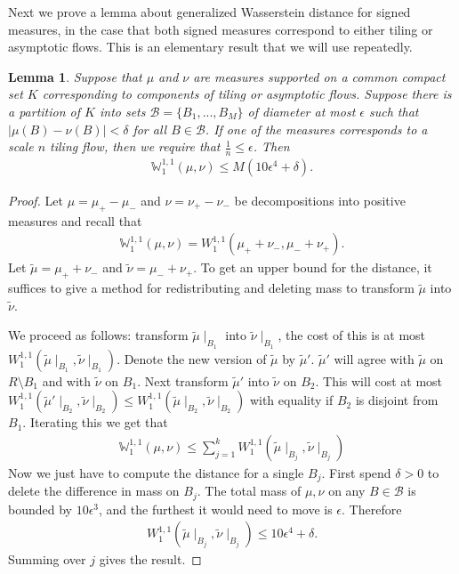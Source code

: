 \documentclass[11pt]{article}
\newtheorem{lemma}[thm]{Lemma}
\theoremstyle{remark}
\theoremstyle{definition}
\newcommand{\mc}[1]{\mathcal{#1}}
\newcommand{\m}[1]{\mathbb{#1}}
\begin{document}
Next we prove a lemma about generalized Wasserstein distance for signed measures, in the case that both signed measures correspond to either tiling or asymptotic flows. This is an elementary result that we will use repeatedly.
\begin{lemma}\label{lem:covered}
	Suppose that $\mu$ and $\nu$ are measures supported on a common compact set $K$ corresponding to components of tiling or asymptotic flows. Suppose there is a partition of $K$ into sets $\mathcal{B} = \{B_1,...,B_M\}$ of diameter at most $\epsilon$ such that $\bigg|\mu(B)-\nu(B) \bigg| < \delta$ for all $B\in \mathcal{B}$. If one of the measures corresponds to a scale $n$ tiling flow, then we require that $\frac{1}{n}\leq \epsilon$. Then 
	\begin{align*}
		\m W^{1,1}_1(\mu,\nu) \leq M(10\epsilon^4 +\delta).
	\end{align*}
\end{lemma}
\begin{proof}
Let $\mu = \mu_+ - \mu_-$ and $\nu = \nu_+ - \nu_-$ be decompositions into positive measures and recall that
\begin{align*}
    \m W_1^{1,1}(\mu,\nu) = W_1^{1,1}(\mu_+ + \nu_-, \mu_- + \nu_+).
\end{align*}
Let $\tilde{\mu} = \mu_+ + \nu_-$ and $\tilde{\nu} = \mu_- + \nu_+$. To get an upper bound for the distance, it suffices to give a method for redistributing and deleting mass to transform $\tilde{\mu}$ into $\tilde{\nu}$.  

We proceed as follows: transform $\tilde{\mu}\mid_{B_1}$ into $\tilde{\nu}\mid_{B_1}$, the cost of this is at most $W^{1,1}_1(\tilde{\mu}\mid_{B_1}, \tilde{\nu}\mid_{B_1})$. Denote the new version of $\tilde{\mu}$ by $\tilde{\mu}'$. $\tilde{\mu}'$ will agree with $\tilde{\mu}$ on $R\setminus B_1$ and with $\tilde{\nu}$ on $B_1$. Next transform $\tilde{\mu}'$ into $\tilde{\nu}$ on $B_2$. This will cost at most $W^{1,1}_1(\tilde{\mu}'\mid_{B_2},\tilde{\nu}\mid_{B_2}) \leq W^{1,1}_1(\tilde{\mu}\mid_{B_2}, \tilde{\nu}\mid_{B_2})$ with equality if $B_2$ is disjoint from $B_1$. Iterating this we get that
	\begin{align*}
		\m W^{1,1}_1({\mu},{\nu}) \leq \sum_{j=1}^{k} W^{1,1}_1(\tilde{\mu}\mid_{B_j}, \tilde{\nu}\mid_{B_j})
	\end{align*}
	Now we just have to compute the distance for a single $B_j$. First spend $\delta>0$ to delete the difference in mass on $B_j$. The total mass of $\mu, \nu$ on any $B\in \mc B$ is bounded by $10 \epsilon^3$, and the furthest it would need to move is $\epsilon$. Therefore
		\begin{align*}
		W^{1,1}_1(\tilde{\mu}\mid_{B_j}, \tilde{\nu}\mid_{B_j}) \leq 10 \epsilon^4 + \delta.
	\end{align*}
	Summing over $j$ gives the result. 
\end{proof}
\end{document}
